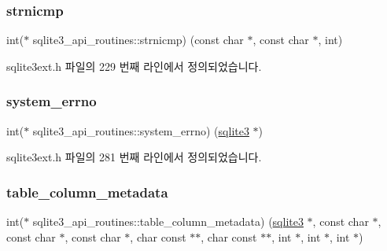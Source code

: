 \mbox{\label{structsqlite3__api__routines_afae159e66af1ef44594688fc0c5776d6}} 
\subsubsection{\texorpdfstring{strnicmp}{strnicmp}}
{\footnotesize\ttfamily int($\ast$ sqlite3\+\_\+api\+\_\+routines\+::strnicmp) (const char $\ast$, const char $\ast$, int)}



sqlite3ext.\+h 파일의 229 번째 라인에서 정의되었습니다.

\mbox{\label{structsqlite3__api__routines_a47c5c8b23150912e014dd155cf8f4ddd}} 
\subsubsection{\texorpdfstring{system\+\_\+errno}{system\_errno}}
{\footnotesize\ttfamily int($\ast$ sqlite3\+\_\+api\+\_\+routines\+::system\+\_\+errno) (\hyperlink{sqlite3_8h_a0ef6f2646262c8a9b24368d8ac140f69}{sqlite3} $\ast$)}



sqlite3ext.\+h 파일의 281 번째 라인에서 정의되었습니다.

\mbox{\label{structsqlite3__api__routines_a8f0cef68458ef530829177f7ca5168f9}} 
\subsubsection{\texorpdfstring{table\+\_\+column\+\_\+metadata}{table\_column\_metadata}}
{\footnotesize\ttfamily int($\ast$ sqlite3\+\_\+api\+\_\+routines\+::table\+\_\+column\+\_\+metadata) (\hyperlink{sqlite3_8h_a0ef6f2646262c8a9b24368d8ac140f69}{sqlite3} $\ast$, const char $\ast$, const char $\ast$, const char $\ast$, char const  $\ast$$\ast$, char const  $\ast$$\ast$, int $\ast$, int $\ast$, int $\ast$)}



